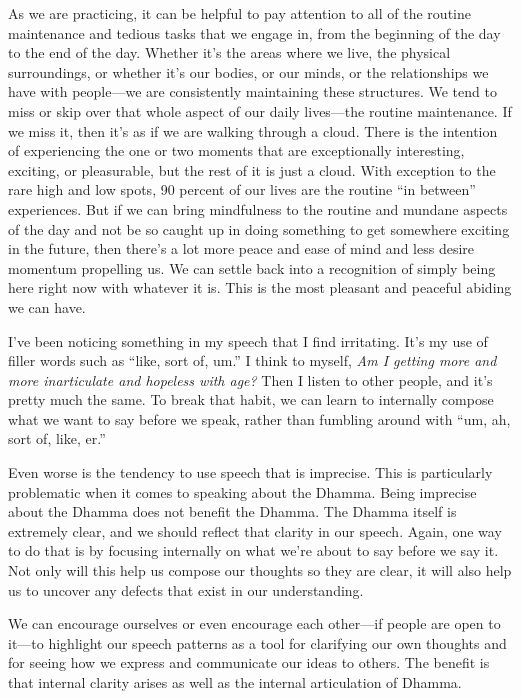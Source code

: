 As we are practicing, it can be helpful to pay attention to all of the 
routine maintenance and tedious tasks that we engage in, from the 
beginning of the day to the end of the day. Whether it's the areas 
where we live, the physical surroundings, or whether it's our bodies, 
or our minds, or the relationships we have with people---we are 
consistently maintaining these structures. We tend to miss or skip over 
that whole aspect of our daily lives---the routine maintenance. If we 
miss it, then it's as if we are walking through a cloud. There is the 
intention of experiencing the one or two moments that are exceptionally 
interesting, exciting, or pleasurable, but the rest of it is just a 
cloud. With exception to the rare high and low spots, 90 percent of our 
lives are the routine ``in between'' experiences. But if we can bring 
mindfulness to the routine and mundane aspects of the day and not be so 
caught up in doing something to get somewhere exciting in the future, 
then there's a lot more peace and ease of mind and less desire momentum 
propelling us. We can settle back into a recognition of simply being 
here right now with whatever it is. This is the most pleasant and 
peaceful abiding we can have.


I've been noticing something in my speech that I find irritating. It's 
my use of filler words such as ``like, sort of, um.'' I think to 
myself, \emph{Am I getting more and more inarticulate and hopeless with 
age?} Then I listen to other people, and it's pretty much the same. To 
break that habit, we can learn to internally compose what we want to 
say before we speak, rather than fumbling around with ``um, ah, sort 
of, like, er.''

Even worse is the tendency to use speech that is imprecise. This is 
particularly problematic when it comes to speaking about the Dhamma. 
Being imprecise about the Dhamma does not benefit the Dhamma. The 
Dhamma itself is extremely clear, and we should reflect that clarity in 
our speech. Again, one way to do that is by focusing internally on what 
we're about to say before we say it. Not only will this help us compose 
our thoughts so they are clear, it will also help us to uncover any 
defects that exist in our understanding.

We can encourage ourselves or even encourage each other---if people are 
open to it---to highlight our speech patterns as a tool for clarifying 
our own thoughts and for seeing how we express and communicate our 
ideas to others. The benefit is that internal clarity arises as well as 
the internal articulation of Dhamma.

